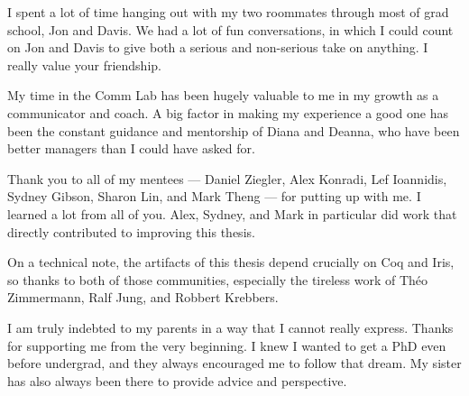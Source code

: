 I spent a lot of time hanging out with my two roommates through most of grad
school, Jon and Davis. We had a lot of fun conversations, in which I could count
on Jon and Davis to give both a serious and non-serious take on anything. I
really value your friendship.

My time in the Comm Lab has been hugely valuable to me in my growth as a
communicator and coach. A big factor in making my experience a good one has been
the constant guidance and mentorship of Diana and Deanna, who have been better
managers than I could have asked for.

Thank you to all of my mentees --- Daniel Ziegler, Alex Konradi, Lef Ioannidis,
Sydney Gibson, Sharon Lin, and Mark Theng --- for putting up with me. I learned
a lot from all of you. Alex, Sydney, and Mark in particular did work that
directly contributed to improving this thesis.

On a technical note, the artifacts of this thesis depend crucially on Coq and
Iris, so thanks to both of those communities, especially the tireless work of
Th\'eo Zimmermann, Ralf Jung, and Robbert Krebbers.

I am truly indebted to my parents in a way that I cannot really express. Thanks
for supporting me from the very beginning. I knew I wanted to get a PhD even
before undergrad, and they always encouraged me to follow that dream. My sister
has also always been there to provide advice and perspective.
